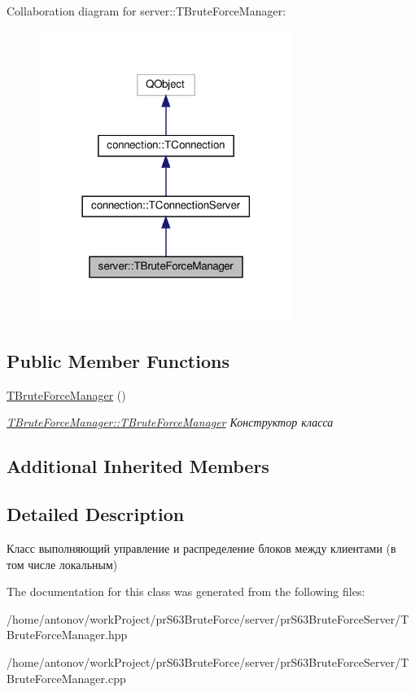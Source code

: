 Collaboration diagram for server\+:\+:T\+Brute\+Force\+Manager\+:\nopagebreak
\begin{figure}[H]
\begin{center}
\leavevmode
\includegraphics[width=234pt]{classserver_1_1_t_brute_force_manager__coll__graph}
\end{center}
\end{figure}
\subsection*{Public Member Functions}
\begin{DoxyCompactItemize}
\item 
\mbox{\label{classserver_1_1_t_brute_force_manager_ac7c9f1590534d38fe05c422e7fada979}} 
\hyperlink{classserver_1_1_t_brute_force_manager_ac7c9f1590534d38fe05c422e7fada979}{T\+Brute\+Force\+Manager} ()
\begin{DoxyCompactList}\small\item\em \hyperlink{classserver_1_1_t_brute_force_manager_ac7c9f1590534d38fe05c422e7fada979}{T\+Brute\+Force\+Manager\+::\+T\+Brute\+Force\+Manager} Конструктор класса \end{DoxyCompactList}\end{DoxyCompactItemize}
\subsection*{Additional Inherited Members}


\subsection{Detailed Description}
Класс выполняющий управление и распределение блоков между клиентами (в том числе локальным) 

The documentation for this class was generated from the following files\+:\begin{DoxyCompactItemize}
\item 
/home/antonov/work\+Project/pr\+S63\+Brute\+Force/server/pr\+S63\+Brute\+Force\+Server/T\+Brute\+Force\+Manager.\+hpp\item 
/home/antonov/work\+Project/pr\+S63\+Brute\+Force/server/pr\+S63\+Brute\+Force\+Server/T\+Brute\+Force\+Manager.\+cpp\end{DoxyCompactItemize}

